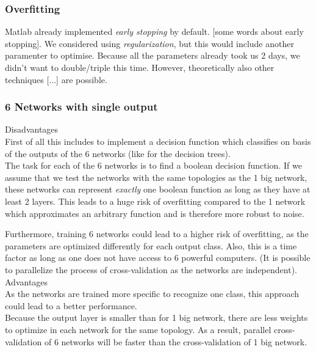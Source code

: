 \documentclass{article}
\begin{document}
\subsubsection{Overfitting}
Matlab already implemented \emph{early stopping} by default. [some words about early stopping]. We considered using \emph{regularization}, but this would include another paramenter to optimise. Because all the parameters already took us 2 days, we didn't want to double/triple this time. However, theoretically also other techniques [...] are possible.

\subsubsection{6 Networks with single output}
Disadvantages\\
First of all this includes to implement a decision function which classifies on basis of the outputs of the 6 networks (like for the decision trees).\\
The task for each of the 6 networks is to find a boolean decision function. If we assume that we test the networks with the same topologies as the 1 big network, these networks can represent \textit{exactly} one boolean function as long as they have at least 2 layers. This leads to a huge risk of overfitting compared to the 1 network which approximates an arbitrary function and is therefore more robust to noise.

Furthermore, training 6 networks could lead to a higher risk of overfitting, as the parameters are optimized differently for each output class. Also, this is a time factor as long as one does not have access to 6 powerful computers. (It is possible to parallelize the process of cross-validation as the networks are independent).
\\
Advantages\\
As the networks are trained more specific to recognize one class, this approach could lead to a better performance.\\
Because the output layer is smaller than for 1 big network, there are less weights to optimize in each network for the same topology. As a result, parallel cross-validation of 6 networks will be faster than the cross-validation of 1 big network.
\end{document}
